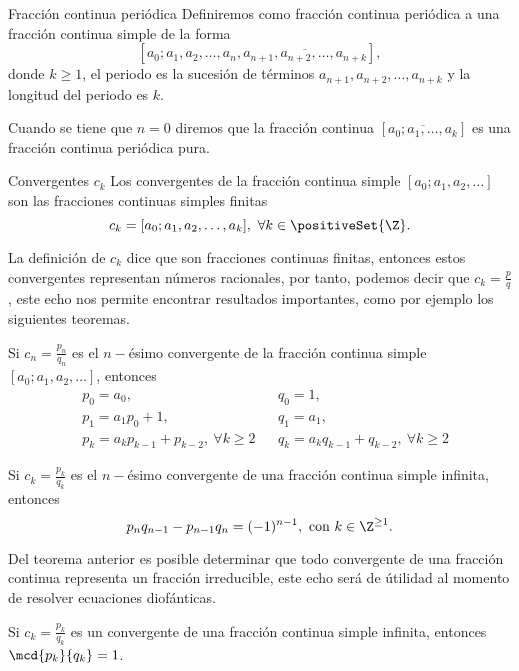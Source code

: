 \begin{definition.box}{Fracción continua periódica}{}
    Definiremos como fracción continua periódica a una fracción continua simple de la forma
    \[
        [a_0; a_1, a_2, \ldots, a_n, \overline{a_{n + 1}, a_{n + 2},\ldots, a_{n + k}}],
    \]
    donde $k \geq 1$, el periodo es la sucesión de términos $a_{n + 1}, a_{n + 2},\ldots, a_{n + k}$ y la longitud del periodo es $k$.
\end{definition.box}

Cuando se tiene que $n = 0$ diremos que la fracción continua $[\overline{a_0;a_1, \ldots, a_k}]$ es una fracción continua periódica pura.

\begin{definition.box}{Convergentes $c_k$}{}
    Los convergentes de la fracción continua simple $[a_0; a_1, a_2, \ldots]$ son las fracciones continuas simples finitas
    \[
        c_k = [a_0; a_1, a_2, \ldots, a_k],\ \forall k \in \positiveSet{\Z}.
    \]
\end{definition.box}

La definición de $c_k$ dice que son fracciones continuas finitas, entonces estos convergentes representan números racionales,
por tanto, podemos decir que $c_k = \frac{p}{q}$, este echo nos permite encontrar resultados importantes, como por ejemplo los siguientes teoremas.

\begin{theorem.box}{}{}
    Si $c_n = \frac{p_n}{q_n}$ es el $n-$ésimo convergente de la fracción continua simple $[a_0; a_1, a_2, \ldots]$, entonces
    \begin{align*}
        &p_0 = a_0, && q_0 = 1,\\
        &p_1 = a_1 p_0 + 1, && q_1 = a_1,\\
        &p_k = a_k p_{k - 1} + p_{k - 2},\ \forall k \geq 2 && q_k = a_k q_{k - 1} + q_{k - 2},\ \forall k \geq 2
    \end{align*}
\end{theorem.box}

\begin{theorem.box}{}{}
    Si $c_k = \frac{p_k}{q_k}$ es el $n-$ésimo convergente de una fracción continua simple infinita, entonces
    \[
        p_n q_{n - 1} - p_{n - 1}q_n = (- 1)^{n-1}, \ \text{con}\ k \in \Z^{\geq 1}.
    \]
\end{theorem.box}
Del teorema anterior es posible determinar que todo convergente de una fracción continua representa un fracción irreducible, este echo será de útilidad al momento de resolver ecuaciones diofánticas.
\begin{corollary}
    Si $c_k = \frac{p_k}{q_k}$ es un convergente de una fracción continua simple infinita, entonces $\mcd{p_k}{q_k} = 1$.
\end{corollary}


